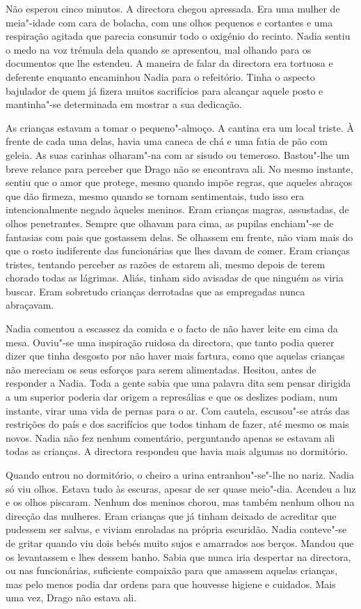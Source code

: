 Não esperou cinco minutos. A directora chegou apressada. Era uma
mulher de meia"-idade com cara de bolacha, com uns olhos pequenos e
cortantes e uma respiração agitada que parecia consumir todo o oxigénio
do recinto. Nadia sentiu o medo na voz trémula dela quando se apresentou, mal olhando para os documentos que lhe estendeu. A maneira de
falar da directora era tortuosa e deferente enquanto encaminhou Nadia
para o refeitório. Tinha o aspecto bajulador de quem já fizera muitos
sacrifícios para alcançar aquele posto e mantinha"-se determinada em mostrar a sua dedicação.

As crianças estavam a tomar o pequeno"-almoço. A cantina era um local
triste. À frente de cada uma delas, havia uma caneca de chá e uma fatia
de pão com geleia. As suas carinhas olharam"-na com ar sisudo ou
temeroso. Bastou"-lhe um breve relance para perceber que Drago não se encontrava ali. No
mesmo instante, sentiu que o amor que protege, mesmo quando impõe
regras, que aqueles abraços que dão firmeza, mesmo quando se tornam
sentimentais, tudo isso era intencionalmente negado àqueles meninos.
Eram crianças magras, assustadas, de olhos penetrantes. Sempre que
olhavam para cima, as pupilas enchiam"-se de fantasias com pais que
gostassem delas. Se olhassem em frente, não viam mais do que o rosto
indiferente das funcionárias que lhes davam de comer. Eram crianças
tristes, tentando perceber as razões de estarem ali, mesmo depois de
terem chorado todas as lágrimas. Aliás, tinham sido avisadas de que
ninguém as viria buscar. Eram sobretudo crianças derrotadas que as
empregadas nunca abraçavam.

Nadia comentou a escassez da comida e o facto de não haver leite em cima
da mesa. Ouviu"-se uma inspiração ruidosa da directora, que tanto podia
querer dizer que tinha desgosto por não haver mais fartura, como que
aquelas crianças não mereciam os seus esforços para serem alimentadas.
Hesitou, antes de responder a Nadia. Toda a gente sabia que uma palavra
dita sem pensar dirigida a um superior poderia dar origem a represálias
e que os deslizes podiam, num instante, virar uma vida de pernas para o
ar. Com cautela, escusou"-se atrás das restrições do país e dos
sacrifícios que todos tinham de fazer, até mesmo os mais novos. Nadia
não fez nenhum comentário, perguntando apenas se estavam ali todas as
crianças. A directora respondeu que havia mais algumas no dormitório.

Quando entrou no dormitório, o cheiro a urina entranhou"-se"-lhe no nariz. Nadia só viu olhos. Estava tudo às escuras,
apesar de ser quase meio"-dia. Acendeu a luz e os olhos piscaram. Nenhum
dos meninos chorou, mas também nenhum olhou na direcção das mulheres.
Eram crianças que já tinham deixado de acreditar que pudessem ser
salvas, e viviam enroladas na própria escuridão. Nadia conteve"-se de
gritar quando viu dois bebés muito sujos e amarrados aos berços. Mandou
que os levantassem e lhes dessem banho. Sabia que nunca iria despertar
na directora, ou nas funcionárias, suficiente compaixão para que amassem aquelas crianças, mas pelo menos podia dar ordens para que houvesse
higiene e cuidados. Mais uma vez, Drago não estava ali.

